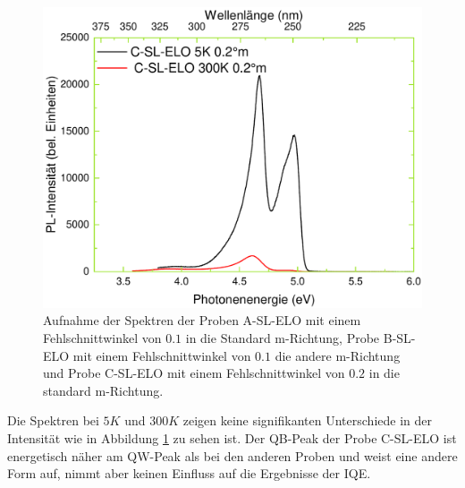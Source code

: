 \begin{figure}[H]
\begin{minipage}[t]{0.49\textwidth}
  \end{minipage}
	\hfill
  \begin{minipage}[t]{0.49\textwidth}
    \centering
    \includegraphics[width=\linewidth]{Bilder/TS4048/cslelo.pdf}
  \end{minipage}
	\caption{Aufnahme der Spektren der Proben A-SL-ELO mit einem Fehlschnittwinkel von $0.1$ in die Standard m-Richtung, Probe B-SL-ELO mit einem Fehlschnittwinkel von $0.1$ die andere m-Richtung und Probe C-SL-ELO mit einem Fehlschnittwinkel von $0.2$ in die standard m-Richtung. }
	\label{fig:spectrassl}
\end{figure}
\noindent 
Die Spektren bei $5K$ und $300K$ zeigen keine signifikanten Unterschiede in der Intensität wie in Abbildung \ref{fig:spectrassl} zu sehen ist. Der QB-Peak der Probe C-SL-ELO ist energetisch näher am QW-Peak als bei den anderen Proben und weist eine andere Form auf, nimmt aber keinen Einfluss auf die Ergebnisse der IQE. 
